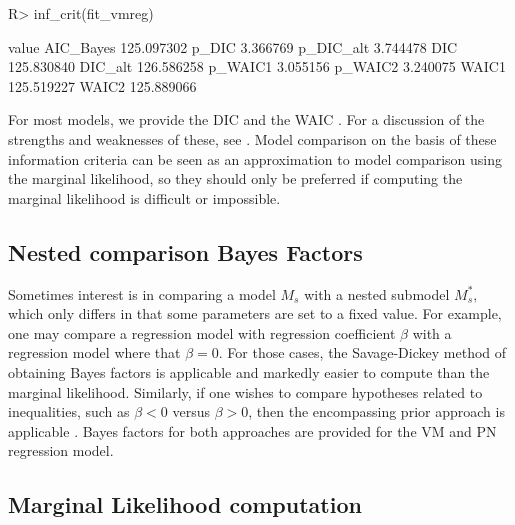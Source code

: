 \begin{CodeChunk}

\begin{CodeInput}
R> inf_crit(fit_vmreg)
\end{CodeInput}

\begin{CodeOutput}
               value
AIC_Bayes 125.097302
p_DIC       3.366769
p_DIC_alt   3.744478
DIC       125.830840
DIC_alt   126.586258
p_WAIC1     3.055156
p_WAIC2     3.240075
WAIC1     125.519227
WAIC2     125.889066
\end{CodeOutput}
\end{CodeChunk}

For most models, we provide the DIC \citep{spiegelhalter2002bayesian}
and the WAIC \citep{watanabe2010asymptotic}. For a discussion of the
strengths and weaknesses of these, see
\citet[Ch. 7]{gelman2003bayesian}. Model comparison on the basis of
these information criteria can be seen as an approximation to model
comparison using the marginal likelihood, so they should only be
preferred if computing the marginal likelihood is difficult or
impossible.

\hypertarget{nested-comparison-bayes-factors}{%
\subsection{Nested comparison Bayes
Factors}\label{nested-comparison-bayes-factors}}

\label{sec:nested}

Sometimes interest is in comparing a model \(M_s\) with a nested
submodel \(M^\ast_s,\) which only differs in that some parameters are
set to a fixed value. For example, one may compare a regression model
with regression coefficient \(\beta\) with a regression model where that
\(\beta = 0.\) For those cases, the Savage-Dickey method of obtaining
Bayes factors is applicable
\citep{dickey1970weighted, o2004kendall, wagenmakers2010sdd} and
markedly easier to compute than the marginal likelihood. Similarly, if
one wishes to compare hypotheses related to inequalities, such as
\(\beta < 0\) versus \(\beta > 0\), then the encompassing prior approach
is applicable \citet{klugkist2005inequality, wetzels2010encompassing}.
Bayes factors for both approaches are provided for the VM and PN
regression model.

\hypertarget{marginal-likelihood-computation}{%
\subsection{Marginal Likelihood
computation}\label{marginal-likelihood-computation}}

